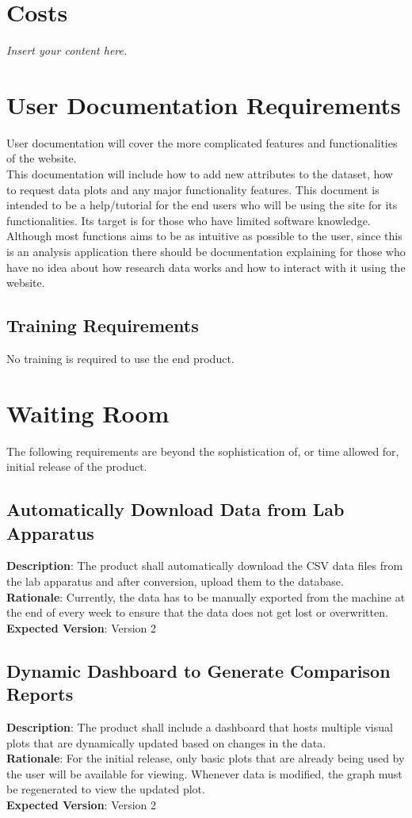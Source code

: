 \documentclass[12pt]{article}
\newcommand{\lips}{\textit{Insert your content here.}}
\begin{document}
\section{Costs}
\lips
\section{User Documentation Requirements}
User documentation will cover the more complicated features and functionalities of the website.\\

\noindent This documentation will include how to add new attributes to the dataset, how
to request data plots and any major functionality features. \newline
This document is intended to be a help/tutorial for the end users who will be
using the site for its functionalities. Its target is for those who have limited
software knowledge. Although most functions aims to be as intuitive as possible
to the user, since this is an analysis application there should be documentation
explaining for those who have no idea about how research data works and how to
interact with it using the website.

\subsection{Training Requirements}
No training is required to use the end product.
\section{Waiting Room}
The following requirements are beyond the sophistication of, or time allowed
for, initial release of the product.
\subsection{Automatically Download Data from Lab Apparatus}
\textbf{Description}: The product shall automatically download the CSV data
files from the lab apparatus and after conversion, upload them to the
database.\\
\textbf{Rationale}: Currently, the data has to be manually exported from the
machine at the end of every week to ensure that the data does not get lost or
overwritten.\\
\textbf{Expected Version}: Version 2

\subsection{Dynamic Dashboard to Generate Comparison Reports}
\textbf{Description}: The product shall include a dashboard that hosts multiple
visual plots that are dynamically updated based on changes in the data.\\
\textbf{Rationale}: For the initial release, only basic plots that are already
being used by the user will be available for viewing. Whenever data is modified,
the graph must be regenerated to view the updated plot.\\
\textbf{Expected Version}: Version 2
\end{document}
